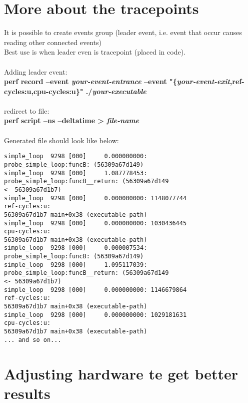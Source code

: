 \documentclass[11pt,onecolumn]{article}
\begin{document}
\newpage

\section{More about the tracepoints}

It is possible to create events group (leader event, i.e. event that occur causes reading other connected events)\\
Best use is when leader even is tracepoint (placed in code).\\\\
Adding leader event:\\
\textbf{perf record --event \textit{your-event-entrance} --event "\{\textit{your-event-exit},ref-cycles:u,cpu-cycles:u\}" ./\textit{your-executable}}\\\\
redirect to file:\\
\textbf{perf script --ns --deltatime > \textit{file-name}}\\\\
Generated file should look like below:
\begin{verbatim}
simple_loop  9298 [000]     0.000000000:         probe_simple_loop:funcB: (56309a67d149)
simple_loop  9298 [000]     1.087778453: probe_simple_loop:funcB__return: (56309a67d149
<- 56309a67d1b7)
simple_loop  9298 [000]     0.000000000: 1148077744                    ref-cycles:u:      
56309a67d1b7 main+0x38 (executable-path)
simple_loop  9298 [000]     0.000000000: 1030436445                    cpu-cycles:u:      
56309a67d1b7 main+0x38 (executable-path)
simple_loop  9298 [000]     0.000007534:         probe_simple_loop:funcB: (56309a67d149)
simple_loop  9298 [000]     1.095117039: probe_simple_loop:funcB__return: (56309a67d149
<- 56309a67d1b7)
simple_loop  9298 [000]     0.000000000: 1146679864                    ref-cycles:u:      
56309a67d1b7 main+0x38 (executable-path)
simple_loop  9298 [000]     0.000000000: 1029181631                    cpu-cycles:u:      
56309a67d1b7 main+0x38 (executable-path)
... and so on...
\end{verbatim}

\section{Adjusting hardware te get better results}
\end{document}
